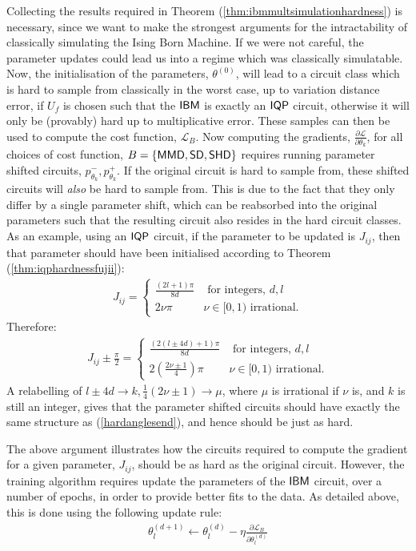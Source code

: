 Collecting the results required in Theorem (\ref{thm:ibmmultsimulationhardness}) is necessary, since we want to make the strongest arguments for the intractability of classically simulating the Ising Born Machine. If we were not careful, the parameter updates could lead us into a regime which was classically simulatable.
Now, the initialisation of the parameters, $\theta^{(0)}$, will lead to a circuit class which is hard to sample from classically in the worst case, up to variation distance error, if $U_f$ is chosen such that the $\textsf{IBM}$ is exactly an $\operatorname{\textsf{IQP}}$ circuit, otherwise it will only be (provably) hard up to multiplicative error. These samples can then be used to compute the cost function, $\mathcal{L}_B$. Now computing the gradients, $\frac{\partial \mathcal{L}}{\partial \theta_k}$, for all choices of cost function, $B = \{\operatorname{\textsf{MMD}}, \operatorname{\textsf{SD}}, \operatorname{\textsf{SHD}}\}$ requires running parameter shifted circuits, $p^-_{\theta_k}, p^+_{\theta_k}$. If the original circuit is hard to sample from, these shifted circuits will \textit{also} be hard to sample from. This is due to the fact that they only differ by a single parameter shift, which can be reabsorbed into the original parameters such that the resulting circuit also resides in the hard circuit classes. As an example, using an $\operatorname{\textsf{IQP}}$ circuit, if the parameter to be updated is $J_{ij}$, then that parameter should have been initialised according to Theorem (\ref{thm:iqphardnessfujii}):
\begin{align}
J_{ij} = \begin{cases}
\frac{(2l+1)\pi}{8d} &\text{ for integers, } d, l\\
 2\nu \pi& \nu \in[0,1) \text{ irrational.}
 \end{cases} \label{hardanglesend}
\end{align}
Therefore:
\begin{align}
J_{ij}\pm \frac{\pi}{2} = \begin{cases}
\frac{(2(l \pm 4d)+1)\pi}{8d} &\text{ for integers, } d, l\\
 2\left(\frac{2\nu \pm 1}{4}\right) \pi& \nu \in[0,1) \text{ irrational.}
 \end{cases}
\end{align}
A relabelling of $l\pm 4d \rightarrow k, \frac{1}{4}(2\nu \pm 1) \rightarrow \mu$, where $\mu$ is irrational if $\nu$ is, and $k$ is still an integer, gives that the parameter shifted circuits should have exactly the same structure as (\ref{hardanglesend}), and hence should be just as hard. 

The above argument illustrates how the circuits required to compute the gradient for a given parameter, $J_{ij}$, should be as hard as the original circuit. However, the training algorithm requires update the parameters of the $\textsf{IBM}$ circuit, over a number of epochs, in order to provide better fits to the data. As detailed above, this is done using the following update rule:
\begin{align}
    \theta_l^{(d+1)} \leftarrow \theta_l^{(d)} - \eta \frac{\partial \mathcal{L}_B}{\partial \theta^{(d)}_l} \label{updaterule}
\end{align}

